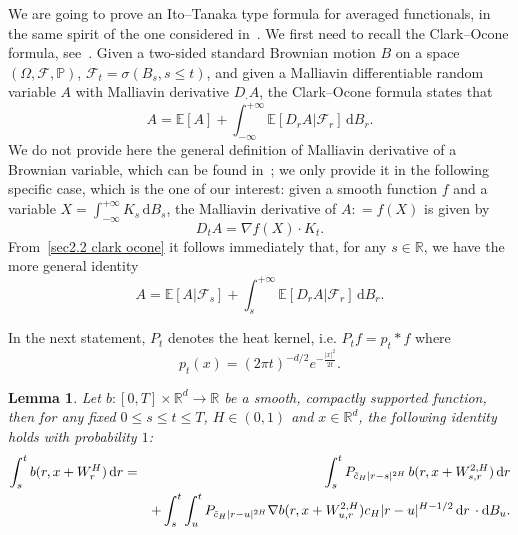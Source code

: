 \documentclass[10pt]{article}
\newcommand{\mathd}{\mathrm{d}}
\newcommand{\nobracket}{}
\newcommand{\tmcolor}[2]{{\color{#1}{#2}}}
\newtheorem{lemma}{Lemma}
\begin{document}
We are going to prove an Ito--Tanaka type formula for averaged functionals,
in the same spirit of the one considered in~{\cite{coutin}}. We first need to
recall the Clark--Ocone formula, see~{\cite{nualart2006}}. Given a
two\mbox{-}sided standard Brownian motion $B$ on a space $(\Omega,
\mathcal{F}, \mathbb{P})$, $\mathcal{F}_t = \sigma (B_s, s \leqslant t)$, and
given a Malliavin differentiable random variable $A$ with Malliavin derivative
$D_{\cdot} A$, the Clark--Ocone formula states that
\begin{equation}
  A =\mathbb{E} [A] + \int_{- \infty}^{+ \infty} \mathbb{E} [D_r A |
  \mathcal{F}_r \nobracket] \, \mathd B_r . \label{sec2.2 clark ocone}
\end{equation}
We do not provide here the general definition of Malliavin derivative of a
Brownian variable, which can be found in~{\cite{nualart2006}}; we only provide
it in the following specific case, which is the one of our interest: given a
smooth function $f$ and a variable $X = \int_{- \infty}^{+ \infty} K_s \,
\mathd B_s$, the Malliavin derivative of $A : = f (X)$ is given by
\begin{equation}
  D_t A = \nabla f (X) \cdot K_t . \label{sec2.2 malliavin derivative}
\end{equation}
From~{\eqref{sec2.2 clark ocone}} it follows immediately that, for any $s \in
\mathbb{R}$, we have the more general identity
\[ A =\mathbb{E} [A | \mathcal{F}_s \nobracket] + \int_s^{+ \infty} \mathbb{E}
   [D_r A | \mathcal{F}_r \nobracket] \, \mathd B_r . \]


In the next statement, $P_t$ denotes the heat kernel, i.e. $P_t f = p_t \ast
f$ where
\[ p_t (x) = (2 \pi t)^{- d / 2} e^{- \frac{| x |^2}{2 t}} . \]
\begin{lemma}
  \label{sec3.2 lemma ito tanaka}Let $b : [0, T] \times \mathbb{R}^d
  \rightarrow \mathbb{R}$ be a smooth, compactly supported function, then for
  any fixed $0 \leqslant s \leqslant t \leqslant T$, $H \in (0, 1)$ and $x \in
  \mathbb{R}^d$, the following identity holds with probability $1$:
  \begin{eqnarray}
    \int_s^t b (r, x + W^H_r) \, \mathd r & = & \tmcolor{black}{\int_s^t
    P_{\tilde{c}_H | r - s |^{2 H}} \, b (r, x + W^{2, H}_{s, r}) \, \mathd r}
    \label{sec3.2 preliminary ito tanaka} \\
    &  & + \int_s^t \int_u^t P_{\tilde{c}_H | r - u |^{2 H}} \nabla b (r, x +
    W^{2, H}_{u, r}) c_H | r - u |^{H - 1 / 2} \, \mathd r \, \cdot \mathd B_u
    . \nonumber
  \end{eqnarray}
\end{lemma}
\end{document}
